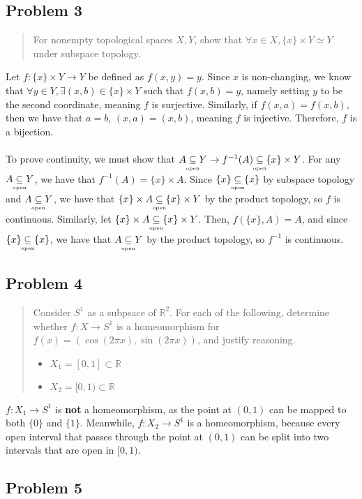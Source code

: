 \documentclass[8pt]{extarticle}
\newcommand{\open}{\underset{\clap{\tiny open}}{\subseteq}}
\begin{document}
{\subsection*{Problem 3}%

\begin{quote}
	For nonempty topological spaces $X,Y$, show that $\forall x\in X, \{x\}\times Y\simeq Y$ under subspace topology.
\end{quote}
Let $f:\{x\}\times Y \rightarrow Y$ be defined as $f(x,y) = y$. Since $x$ is non-changing, we know that $\forall y\in Y,\exists (x,b)\in \{x\}\times Y$ such that $f(x,b) = y$, namely setting $y$ to be the second coordinate, meaning $f$ is surjective. Similarly, if $f(x,a) = f(x,b)$, then we have that $a = b$, $(x,a) = (x,b)$, meaning $f$ is injective. Therefore, $f$ is a bijection.\\
\\
To prove continuity, we must show that $A\open Y \rightarrow f^{-1}(A)\open \{x\}\times Y$. For any $A\open Y$, we have that $f^{-1}(A) = \{x\}\times A$. Since $\{x\}\open \{x\}$ by subspace topology and $A\open Y$, we have that $\{x\}\times A \open \{x\}\times Y$ by the product topology, so $f$ is continuous. Similarly, let $\{x\}\times A \open \{x\}\times Y$. Then, $f(\{x\},A) = A$, and since $\{x\}\open \{x\}$, we have that $A\open Y$ by the product topology, so $f^{-1}$ is continuous.
\subsection*{Problem 4}%
\begin{quote}
	Consider $S^1$ as a subpsace of $\mathbb{R}^2$. For each of the following, determine whether $f:X\rightarrow S^1$ is a homeomorphism for $f(x) = (\cos(2\pi x),\sin(2\pi x))$, and justify reasoning.
	\begin{itemize}
		\item $X_1 = [0,1]\subset \mathbb{R}$
		\item $X_2 = [0,1) \subset \mathbb{R}$
	\end{itemize}
\end{quote}
$f:X_1\rightarrow S^1$ is \textbf{not} a homeomorphism, as the point at $(0,1)$ can be mapped to both $\{0\}$ and $\{ 1\}$. Meanwhile, $f:X_{2}\rightarrow S^1$ is a homeomorphism, because every open interval that passes through the point at $(0,1)$ can be split into two intervals that are open in $[0,1)$.
\subsection*{Problem 5}%

}
\end{document}
